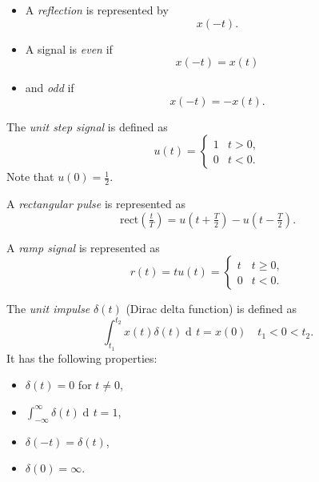 \documentclass[10pt,letterpaper]{article}
\DeclareMathOperator{\di}{d\!} %
\newcommand{\bracks}[1]{ \left( #1 \right) } %
\newcommand{\tpfrac}[2]{\left(\tfrac{#1}{#2}\right)} %
\newcommand{\rect}{ \text{rect} }
\newcommand{\impulse}{ \delta(t) }
\newcommand{\Iint}{ \int_{-\infty}^{\infty} }
\begin{document}
\begin{multicols*}{3}
\begin{itemize}[leftmargin=0.5cm]
\item A \textit{reflection} is represented by
\[ x(-t). \]

\item A signal is \textit{even} if
\[ x(-t) = x(t) \]

\item and \textit{odd} if
\[ x(-t) = -x(t). \]
\end{itemize}

The \textit{unit step signal} is defined as
\[ u(t) = \begin{cases} 
      		1 & t > 0, \\
      		0 & t < 0. 
   		\end{cases}
\]
Note that $u(0) = \frac{1}{2}$.

A \textit{rectangular pulse} is represented as
\[ \rect\tpfrac{t}{T} = u\bracks{t + \tfrac{T}{2}} - u\bracks{t - \tfrac{T}{2}}. \]

A \textit{ramp signal} is represented as
\[ r(t) = tu(t) = \begin{cases} 
		      		t & t \geq 0, \\
		      		0 & t < 0. 
		   		\end{cases}
\]

The \textit{unit impulse} $\impulse$ (Dirac delta function) is defined as
\[ \int_{t_1}^{t_2} x(t) \impulse \di t = x(0) \quad t_1 < 0 < t_2. \]
It has the following properties:
\begin{itemize}[leftmargin=0.5cm]
\item $\impulse = 0$ for $t \neq 0$,
\item $\displaystyle \Iint \impulse \di t = 1$,
\item $\delta(-t) = \impulse$,
\item $\delta(0) = \infty$.
\end{itemize}

\end{multicols*}
\end{document}
